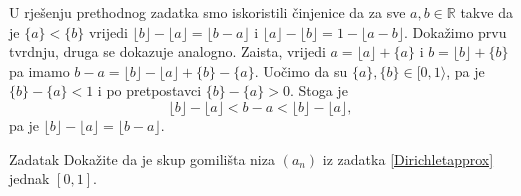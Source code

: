\begin{remark}
\label{floorrem}
U rješenju prethodnog zadatka smo iskoristili činjenice da za sve $a, b\in \mathbb{R}$ takve da je $\{a\}<\{b\}$ vrijedi $\lfloor b\rfloor-\lfloor a\rfloor= \lfloor b-a\rfloor$ i $\lfloor a\rfloor-\lfloor b\rfloor= 1-\lfloor a-b\rfloor$. Dokažimo prvu tvrdnju, druga se dokazuje analogno. Zaista, vrijedi $a=\lfloor a\rfloor+\{a\}$ i $b=\lfloor b\rfloor+\{b\}$
pa imamo $b-a=\lfloor b\rfloor-\lfloor a\rfloor+\{b\}-\{a\}$. Uočimo da su $\{a\}, \{b\}\in [0, 1\rangle$, pa je $\{b\}-\{a\}<1$ i po pretpostavci $\{b\}-\{a\}>0$. Stoga je
$$\lfloor b\rfloor-\lfloor a\rfloor< b-a< \lfloor b\rfloor-\lfloor a\rfloor,$$
pa je $\lfloor b\rfloor-\lfloor a\rfloor= \lfloor b-a\rfloor$.
\end{remark}
\begin{exercise}{Zadatak}
Dokažite da je skup gomilišta niza $(a_n)$ iz zadatka \ref{Dirichletapprox} jednak $[0, 1]$.
\end{exercise}
